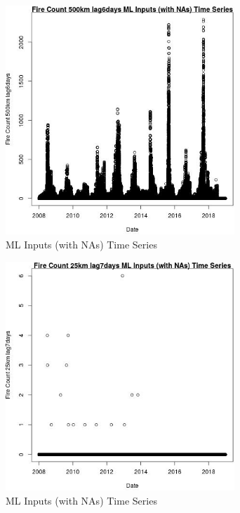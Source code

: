 \begin{figure} 
\centering  
\includegraphics[width=0.77\textwidth]{Code_Outputs/Report_ML_input_PM25_Step4_part_e_de_duplicated_aves_compiled_2019-05-21wNAs_Fire_Count_500km_lag6daysvDate.jpg} 
\caption{\label{fig:Report_ML_input_PM25_Step4_part_e_de_duplicated_aves_compiled_2019-05-21wNAsFire_Count_500km_lag6daysvDate}ML Inputs (with NAs) Time Series} 
\end{figure} 
 

\begin{figure} 
\centering  
\includegraphics[width=0.77\textwidth]{Code_Outputs/Report_ML_input_PM25_Step4_part_e_de_duplicated_aves_compiled_2019-05-21wNAs_Fire_Count_25km_lag7daysvDate.jpg} 
\caption{\label{fig:Report_ML_input_PM25_Step4_part_e_de_duplicated_aves_compiled_2019-05-21wNAsFire_Count_25km_lag7daysvDate}ML Inputs (with NAs) Time Series} 
\end{figure} 
 

